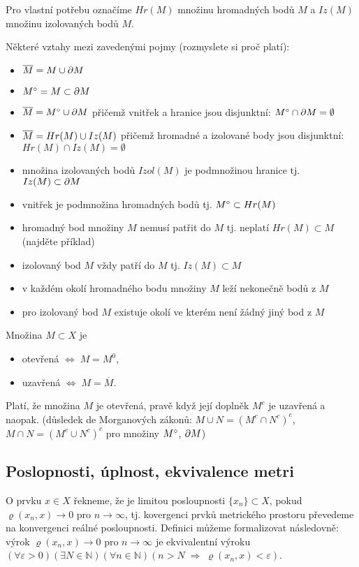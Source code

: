 Pro vlastní potřebu označíme $Hr(M)$ množinu hromadných bodů $M$ a $Iz(M)$ množinu izolovaných bodů $M$.

Některé vztahy mezi zavedenými pojmy (rozmyslete si proč platí):
\begin{itemize}
 \item $\overline{M} = M\cup \partial M$
 \item $M^\circ = M\subset \partial M$ 

 \item $\overline{M}=M^\circ\cup \partial M$ přičemž vnitřek a hranice jsou disjunktní: $M^\circ \cap \partial M = \emptyset$
 \item $\overline{M}=Hr(M) \cup Iz(M)$ přičemž hromadné a izolované body jsou disjunktní: $Hr(M) \cap Iz(M) = \emptyset$

 \item množina izolovaných bodů $Izol(M)$ je podmnožinou hranice tj. $Iz(M) \subset \partial M$
 \item vnitřek je podmnožina hromadných bodů tj. $M^\circ \subset Hr(M)$

 \item hromadný bod množiny $M$ nemusí patřit do $M$ tj. neplatí $Hr(M) \subset M$ (najděte příklad)
 \item izolovaný bod $M$ vždy patří do $M$ tj. $Iz(M) \subset M$

 \item v každém okolí hromadného bodu množiny $M$ leží nekonečně bodů z $M$
 \item pro izolovaný bod $M$ existuje okolí ve kterém není žádný jiný bod z $M$
\end{itemize}

Množina $M\subset X$ je
\begin{itemize}
   \item otevřená $\Leftrightarrow \; M=M^0$,
   \item uzavřená $\Leftrightarrow \; M=\overline{M}$.
\end{itemize}
Platí, že množina $M$ je otevřená, pravě když její doplněk $M^c$ je uzavřená
a naopak. (důsledek de Morganových zákonů: $M\cup N=(M^c\cap N^c)^c$, $M\cap N=(M^c\cup N^c)^c$ pro množiny $M^\circ$, $\partial M$)


\subsection{Poslopnosti, úplnost, ekvivalence metri}
O prvku $x\in X$ řekneme, že je limitou posloupnosti $\{x_n\}\subset X$,
pokud $\varrho(x_n,x)\rightarrow 0$ pro $n\rightarrow\infty$,
tj. kovergenci prvků metrického prostoru převedeme na konvergenci reálné posloupnosti.
Definici můžeme formalizovat následovně:
výrok $\varrho(x_n,x)\rightarrow 0$ pro $n\rightarrow\infty$
je ekvivalentní výroku
$(\forall \varepsilon>0)(\exists N\in\mathbb{N})(\forall n\in\mathbb{N})
(n>N\;\Rightarrow\;\varrho(x_n,x)<\varepsilon)$.

